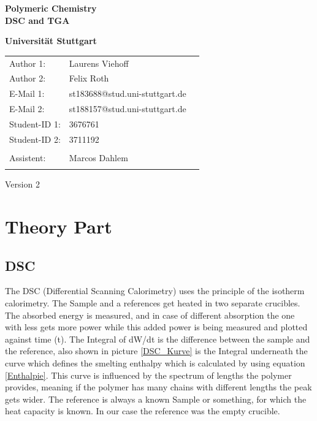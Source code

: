 \documentclass[10pt,a4paper,ngerman]{scrartcl}
\begin{document}
\begin{titlepage}
	\vspace*{2,5cm}
	\begin{center}
		\begin{LARGE}
			\textbf{Polymeric Chemistry}\\
			\textbf{DSC and TGA}\\
		\end{LARGE}
		\vspace{1cm}
		\textbf{Universität Stuttgart}\\
		\vspace*{1,5cm}
		\begin{tabular}{lp{}l}
			Author 1:     &Laurens Viehoff\\
            Author 2:     &Felix Roth\\   
			E-Mail 1:      &st183688@stud.uni-stuttgart.de\\
            E-Mail 2:      &st188157@stud.uni-stuttgart.de  \\
			Student-ID 1: & 3676761   \\ 
            Student-ID 2: & 3711192 \\ \\
			Assistent:  &Marcos Dahlem   \\ \\ 
		\end{tabular}
        
		\vspace{2cm}
		Version 2\\
	\end{center}

    
\end{titlepage}
\thispagestyle{empty}
\renewcommand{\thepage}{\arabic{page}}
\newpage
\tableofcontents
\setcounter{page}{1}
\renewcommand{\thepage}{\arabic{page}}
\newpage

\section{Theory Part}

    \subsection{DSC}

        The DSC (Differential Scanning Calorimetry) uses the principle of the isotherm calorimetry. The Sample and a references get heated in two separate crucibles. 
        The absorbed energy is measured, and in case of different absorption the one with less gets more power while this added power is being measured and plotted against time (t).
        The Integral of dW/dt is the difference between the sample and the reference, also shown in picture \ref{DSC_Kurve} is the Integral underneath the curve which defines the smelting 
        enthalpy which is calculated by using equation \eqref{Enthalpie}. This curve is influenced by the spectrum of lengths the polymer provides, 
        meaning if the polymer has many chains with different lengths the peak gets wider. 
        The reference is always a known Sample or something, for which the heat capacity is known. 
        In our case the reference was the empty crucible.
\end{document}
